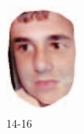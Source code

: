 \begin{figure}[t]
\begin{subfigure}[t]{0.2\textwidth}
		\includegraphics[width=\textwidth]{ilaware_cover3.png}
		\caption{14-16}
	\end{subfigure}
	\begin{subfigure}[t]{0.2\textwidth}

\end{subfigure}
\end{figure}
